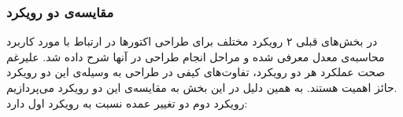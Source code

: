 \subsubsection{مقایسه‌ی دو رویکرد}
در بخش‌های قبلی ۲ رویکرد مختلف برای طراحی اکتورها در ارتباط با مورد کاربرد محاسبه‌ی معدل معرفی شده و مراحل انجام طراحی در آنها شرح داده شد. علیرغم صحت عملکرد هر دو رویکرد، تفاوت‌های کیفی در طراحی به وسیله‌ی این دو رویکرد حائز اهمیت هستند. به همین دلیل در این بخش به مقایسه‌ی این دو رویکرد می‌پردازیم.\\
رویکرد دوم دو تغییر عمده نسبت به رویکرد اول دارد:
